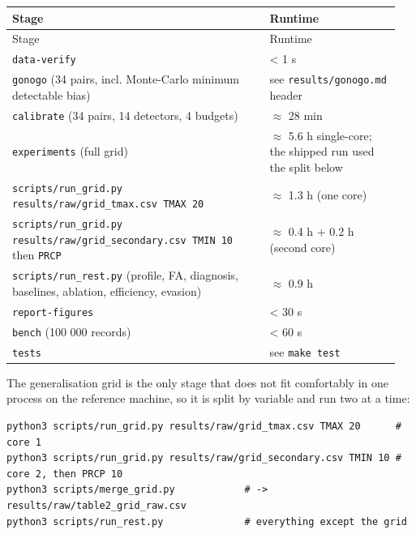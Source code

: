 \documentclass[10pt,a4paper]{article}
\begin{document}
{\small
\setlength{\tabcolsep}{4.5pt}
\setlength{\LTleft}{\fill}
\setlength{\LTright}{\fill}
\begin{longtable}{>{\raggedright\arraybackslash}p{0.631\linewidth}>{\raggedright\arraybackslash}p{0.322\linewidth}}
\toprule
Stage & Runtime \\
\midrule
\endfirsthead
\toprule
Stage & Runtime \\
\midrule
\endhead
\bottomrule
\endlastfoot
\texttt{data-\allowbreak{}verify} & < 1 s \\
\texttt{gonogo} (34 pairs, incl. Monte-\allowbreak{}Carlo minimum detectable bias) & see \texttt{results/\allowbreak{}gonogo.md} header \\
\texttt{calibrate} (34 pairs, 14 detectors, 4 budgets) & $\approx$ 28 min \\
\texttt{experiments} (full grid) & $\approx$ 5.6 h single-\allowbreak{}core; the shipped run used the split below \\
\texttt{scripts/\allowbreak{}run\_\allowbreak{}grid.py results/\allowbreak{}raw/\allowbreak{}grid\_\allowbreak{}tmax.csv TMAX 20} & $\approx$ 1.3 h (one core) \\
\texttt{scripts/\allowbreak{}run\_\allowbreak{}grid.py results/\allowbreak{}raw/\allowbreak{}grid\_\allowbreak{}secondary.csv TMIN 10} then \texttt{PRCP} & $\approx$ 0.4 h + 0.2 h (second core) \\
\texttt{scripts/\allowbreak{}run\_\allowbreak{}rest.py} (profile, FA, diagnosis, baselines, ablation, efficiency, evasion) & $\approx$ 0.9 h \\
\texttt{report-\allowbreak{}figures} & < 30 s \\
\texttt{bench} (100 000 records) & < 60 s \\
\texttt{tests} & see \texttt{make test} \\
\end{longtable}
}

The generalisation grid is the only stage that does not fit comfortably in one process on the reference machine, so it is split by variable and run two at a time:

\begin{Verbatim}[breaklines=true,breakanywhere=true,fontsize=\footnotesize,frame=none,numbers=none]
python3 scripts/run_grid.py results/raw/grid_tmax.csv TMAX 20      # core 1
python3 scripts/run_grid.py results/raw/grid_secondary.csv TMIN 10 # core 2, then PRCP 10
python3 scripts/merge_grid.py            # -> results/raw/table2_grid_raw.csv
python3 scripts/run_rest.py              # everything except the grid
\end{Verbatim}
\end{document}
